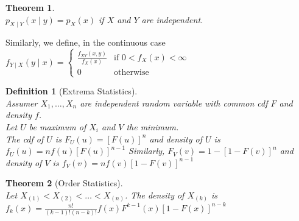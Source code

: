 \documentclass[12pt]{article}
\newtheorem{definition}{Definition}[section]
\newtheorem{theorem}{Theorem}[section]
\theoremstyle{definition}
\begin{document}
\begin{theorem}
\hfill\\\normalfont $p_{X\mid Y}(x\mid y) = p_X(x)$ if $X$ and $Y$ are independent.
\end{theorem}
Similarly, we define, in the continuous case
$
f_{Y\mid X}(y\mid x) = \begin{cases}
\frac{f_{XY}(x,y)}{f_X(x)} & \text{if } 0<f_X(x)<\infty\\
0 & \text{otherwise}
\end{cases}
$
\begin{definition}[Extrema Statistics]
\hfill\\\normalfont Assumer $X_1, \ldots, X_n$ are independent random variable with common cdf $F$ and density $f$.\\
Let $U$ be maximum of $X_i$ and $V$ the minimum.\\
The cdf of $U$ is 
$
F_U(u) = [F(u)]^n
$
and density of $U$ is
$
f_U(u) = nf(u)[F(u)]^{n-1}
$
Similarly,
$
F_V(v) = 1-[1-F(v)]^n
$
and density of $V$ is
$
f_V(v) = nf(v)[1-F(v)]^{n-1}
$
\end{definition}
\begin{theorem}[Order Statistics]
\hfill\\\normalfont Let $X_{(1)}<X_{(2)}<\ldots<X_{(n)}$. The density of $X_{(k)}$ is
$
f_k(x) = \frac{n!}{(k-1)!(n-k)!} f(x) F^{k-1}(x)[1-F(x)]^{n-k}
$
\end{theorem}
\end{document}
